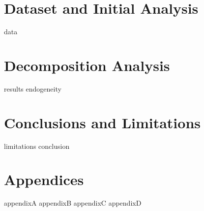 \documentclass[openany,a4paper,12pt]{book}
\begin{document}
\chapter{Dataset and Initial Analysis} %
\label{sec:Dataset}
{data}

\chapter{Decomposition Analysis} %
\label{sec:Analysis}
{results} %
{endogeneity} %

\chapter{Conclusions and Limitations} %
\label{sec:Limitations}
{limitations} %
{conclusion} %
\label{sec:Bibliography}

\label{sec:appendices}
\chapter{Appendices}
{appendixA}
\newpage
{appendixB}
\newpage
{appendixC}
\newpage
{appendixD}

\backmatter


\printglossary[type=\acronymtype, nonumberlist]
\end{document}
